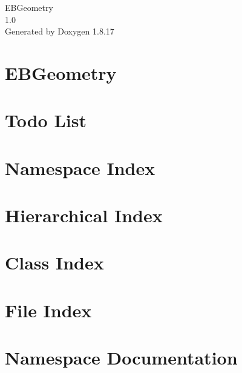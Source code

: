\let\mypdfximage\pdfximage\def\pdfximage{\immediate\mypdfximage}\documentclass[twoside]{book}
\newcommand{\+}{\discretionary{\mbox{\scriptsize$\hookleftarrow$}}{}{}}
\newcommand{\clearemptydoublepage}{%
  \newpage{\pagestyle{empty}\cleardoublepage}%
}
\begin{document}
\hypersetup{pageanchor=false,
             bookmarksnumbered=true,
             pdfencoding=unicode
            }
\begin{titlepage}
\vspace*{7cm}
\begin{center}%
{\Large E\+B\+Geometry \\[1ex]\large 1.\+0 }\\
\vspace*{1cm}
{\large Generated by Doxygen 1.8.17}\\
\end{center}
\end{titlepage}
\clearemptydoublepage
{}
\tableofcontents
\clearemptydoublepage
{}
\hypersetup{pageanchor=true}

\chapter{E\+B\+Geometry}
\label{index}\hypertarget{index}{}
\chapter{Todo List}
\label{todo}

\chapter{Namespace Index}

\chapter{Hierarchical Index}

\chapter{Class Index}

\chapter{File Index}

\chapter{Namespace Documentation}





\end{document}
